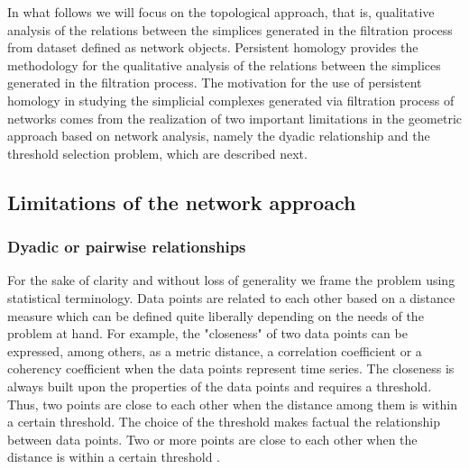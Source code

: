 \documentclass[onecollarge,runningheads]{svjour2}
\begin{document}

In what follows we will focus on the topological approach, that is, qualitative analysis of the relations between the simplices generated in the filtration process from dataset defined as network objects. %
Persistent homology provides the methodology for the qualitative analysis of the relations between the simplices generated in the filtration process. The motivation for the use of persistent homology in studying the simplicial complexes generated via filtration process of networks comes from the realization of two important limitations in the geometric approach based on network analysis, namely the dyadic relationship and the threshold selection problem, which are described next.

\subsection{Limitations of the network approach}
\label{se:limita}

\subsubsection{Dyadic or pairwise relationships}
\label{sse:dy}
For the sake of clarity and without loss of generality we frame the problem using statistical terminology.
Data points are related to each other based on a distance measure which can be defined quite liberally depending on the needs of the problem at hand. For example, the "closeness" of two data points can be expressed, among others, as a metric distance, a correlation coefficient or a coherency coefficient when the data points represent time series.
The closeness is always built upon the properties of the data points and requires a threshold. Thus, two points are close to each other when the distance among them is within a certain threshold. The choice of the threshold makes factual the relationship between data points. Two or more points are close to each other when the distance is within a certain threshold \cite{giusti2016two}.
\end{document}
